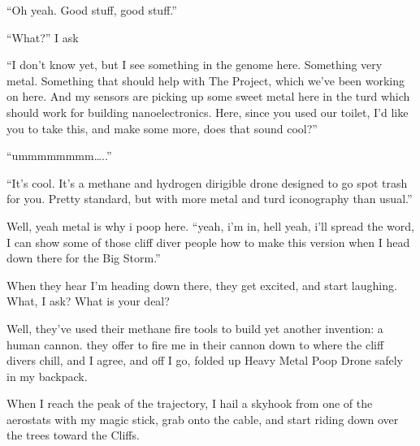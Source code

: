 ``Oh yeah. Good stuff, good stuff.''

``What?'' I ask

``I don't know yet, but I see something in the genome here. Something
very metal. Something that should help with The Project, which we've
been working on here. And my sensors are picking up some sweet metal
here in the turd which should work for building nanoelectronics. Here,
since you used our toilet, I'd like you to take this, and make some
more, does that sound cool?''

``ummmmmmmm\ldots{}..''

``It's cool. It's a methane and hydrogen dirigible drone designed to go
spot trash for you. Pretty standard, but with more metal and turd
iconography than usual.''

Well, yeah metal is why i poop here. ``yeah, i'm in, hell yeah, i'll
spread the word, I can show some of those cliff diver people how to make
this version when I head down there for the Big Storm.''

When they hear I'm heading down there, they get excited, and start
laughing. What, I ask? What is your deal?

Well, they've used their methane fire tools to build yet another
invention: a human cannon. they offer to fire me in their cannon down to
where the cliff divers chill, and I agree, and off I go, folded up Heavy
Metal Poop Drone safely in my backpack.

When I reach the peak of the trajectory, I hail a skyhook from one of
the aerostats with my magic stick, grab onto the cable, and start riding
down over the trees toward the Cliffs.
